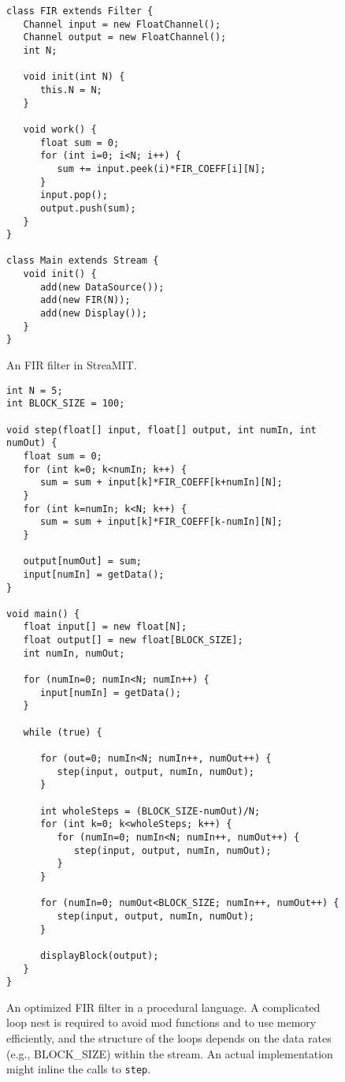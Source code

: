 \begin{figure}
\scriptsize
\begin{verbatim}
class FIR extends Filter {
   Channel input = new FloatChannel();
   Channel output = new FloatChannel();
   int N;

   void init(int N) {
      this.N = N;
   }

   void work() {
      float sum = 0;
      for (int i=0; i<N; i++) {
         sum += input.peek(i)*FIR_COEFF[i][N];
      }
      input.pop();
      output.push(sum);
   }
}

class Main extends Stream {
   void init() {
      add(new DataSource());
      add(new FIR(N));
      add(new Display());
   }
}
\end{verbatim}
\vspace{-12pt}
\caption{\protect\small An FIR filter in StreaMIT.
\protect\label{fig:firstreamit}}
\vspace{-12pt}
\end{figure}

\begin{figure}
\scriptsize
\begin{verbatim}
int N = 5;
int BLOCK_SIZE = 100;

void step(float[] input, float[] output, int numIn, int numOut) {
   float sum = 0;
   for (int k=0; k<numIn; k++) {
      sum = sum + input[k]*FIR_COEFF[k+numIn][N];
   }
   for (int k=numIn; k<N; k++) {
      sum = sum + input[k]*FIR_COEFF[k-numIn][N];
   }

   output[numOut] = sum;
   input[numIn] = getData();
}

void main() {
   float input[] = new float[N];
   float output[] = new float[BLOCK_SIZE];
   int numIn, numOut;

   for (numIn=0; numIn<N; numIn++) {
      input[numIn] = getData();
   }

   while (true) {

      for (out=0; numIn<N; numIn++, numOut++) {
         step(input, output, numIn, numOut);
      }

      int wholeSteps = (BLOCK_SIZE-numOut)/N;
      for (int k=0; k<wholeSteps; k++) {
         for (numIn=0; numIn<N; numIn++, numOut++) {
            step(input, output, numIn, numOut);
         }
      }

      for (numIn=0; numOut<BLOCK_SIZE; numIn++, numOut++) {
         step(input, output, numIn, numOut);
      }

      displayBlock(output);
   }
}
\end{verbatim}
\vspace{-12pt}
\caption{\protect\small An optimized FIR filter in a procedural
   language.  A complicated loop nest is required to avoid mod
   functions and to use memory efficiently, and the structure of the
   loops depends on the data rates (e.g., BLOCK\_SIZE) within the
   stream.  An actual implementation might inline the calls to {\tt step}.
\protect\label{fig:firprocedural}}
\vspace{-12pt}
\end{figure}

